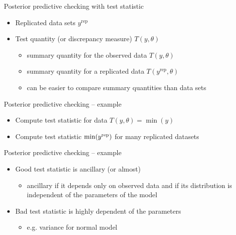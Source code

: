 \documentclass[t]{beamer}
\DeclareMathOperator{\rep}{\mathrm{rep}}
\begin{document}
\begin{frame}

  {\Large\color{navyblue} Posterior predictive checking with test statistic}

  \begin{itemize}
  \item Replicated data sets $y^{\rep}$
  \item Test quantity (or discrepancy measure) $T(y,\theta)$
    \begin{itemize}
    \item summary quantity for the observed data $T(y,\theta)$
    \item summary quantity for a replicated data $T(y^{\rep},\theta)$
    \item can be easier to compare summary quantities than data sets
    \end{itemize}
  \end{itemize}

\end{frame}

\begin{frame}[fragile]

  {\Large\color{navyblue} Posterior predictive checking -- example}

  \begin{itemize}
  \item<1-> Compute test statistic for data $T(y,\theta)=\min(y)$
  \item<2-> Compute test statistic $\min(y^{\rm rep})$ for many replicated datasets 
  \end{itemize}
  \vspace{-1.5\baselineskip}

\end{frame}

\begin{frame}[fragile]

  {\Large\color{navyblue} Posterior predictive checking -- example}

  \begin{itemize}
  \item<1-> Good test statistic is ancillary (or almost)
    \begin{itemize}
    \item ancillary if it depends only on observed data and if its
      distribution is independent of the parameters of the model
    \end{itemize}
  \item<2-> Bad test statistic is highly dependent of the parameters
    \begin{itemize}
    \item e.g. variance for normal model
    \end{itemize}
  \end{itemize}
  \vspace{-1.5\baselineskip}

\end{frame}
\end{document}
